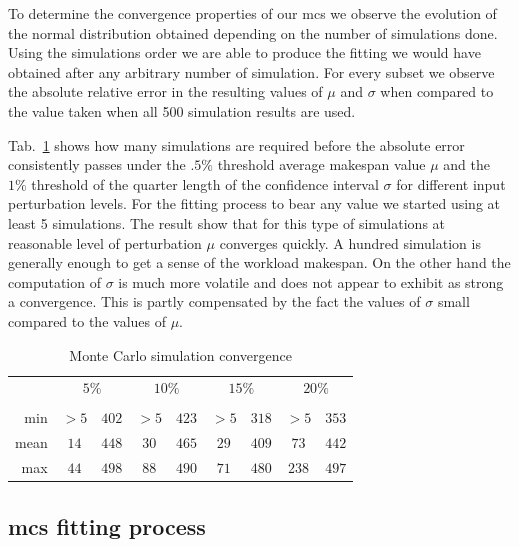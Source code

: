 \documentclass[10pt,conference,compsocconf]{IEEEtran}
\newcommand*\rot{\rotatebox{90}}
\begin{document}
To determine the convergence properties of our \ac{mcs} we observe the evolution
of the normal distribution obtained depending on the number of simulations done. 
Using the simulations order we are able to produce the fitting we would
have obtained after any arbitrary number of simulation. For every subset we
observe the absolute relative error in the resulting values of $\mu$ and $\sigma$ 
when compared to the value taken when all 500 simulation results are used. 

Tab.~\ref{tab:mcs-convergence} shows how many simulations are required before the
absolute error consistently passes under the $.5\%$ threshold average makespan
value $\mu$ and the $1\%$ threshold of the quarter length of the confidence
interval $\sigma$ for different input perturbation levels. For the fitting
process to bear any value we started using at least 5 simulations. The result
show that for this type of simulations at reasonable level of perturbation $\mu$
converges quickly. A hundred simulation is generally enough to get a sense of
the workload makespan. On the other hand the computation of $\sigma$ is much
more volatile and does not appear to exhibit  as strong a convergence. This is
partly compensated by the fact the values of $\sigma$ small compared to the
values of $\mu$.

\begin{table}
	\centering
	\begin{tabular}{|r|cc|cc|cc|cc|}
		\cline{2-9}
		\multicolumn{1}{c|}{}& \multicolumn{2}{c|}{$5\%$}& \multicolumn{2}{c|}{$10\%$}&\multicolumn{2}{c|}{$15\%$}& \multicolumn{2}{c|}{$20\%$}\\
		\multicolumn{1}{c|}{}&\rot{$\mu.ae<.5\%$}&\rot{$\sigma.ae<1\%$}&\rot{$\mu.ae<.5\%$}&\rot{$\sigma.ae<1\%$}&\rot{$\mu.ae<.5\%$}&\rot{$\sigma.ae<1\%$}&\rot{$\mu.ae<.5\%$}&\rot{$\sigma.ae<1\%$}\\
		\hline
		min&$>5$&$402$&$>5$&$423$&$>5$&$318$&$>5$&$353$\\
		mean&$14$&$448$&$30$&$465$&$29$&$409$&$73$&$442$\\
		max&$44$&$498$&$88$&$490$&$71$&$480$&$238$&$497$\\
		\hline
	\end{tabular}
	\caption{Monte Carlo simulation convergence}
	\label{tab:mcs-convergence}
\end{table}

\subsection{\acl{mcs} fitting process}
\end{document}
